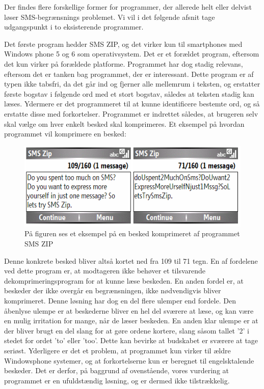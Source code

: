 Der findes flere forskellige former for programmer, der allerede helt eller delvist løser SMS-begrænsnings problemet. Vi vil i det følgende afsnit tage udgangspunkt i to eksisterende programmer.

Det første program hedder SMS ZIP, og det virker kun til smartphones med Windows phone 5 og 6 som operativsystem. Det er et forældet program, eftersom det kun virker på forældede platforme. Programmet har dog stadig relevans,  eftersom det er tanken bag programmet, der er interessant. Dette program er af typen ikke tabsfri, da det går ind og fjerner alle mellemrum i teksten, og erstatter første bogstav i følgende ord med et stort bogstav, således at teksten stadig kan læses. Ydermere er det programmeret til at kunne identificere bestemte ord, og så erstatte disse med forkortelser. Programmet er indrettet således, at brugeren selv skal vælge om hver enkelt besked skal komprimeres. Et eksempel på hvordan programmet vil komprimere en besked: \cite{download-sms} 

\begin{figure}[H]
\includegraphics []{Billeder/SMSZIP.png}
\caption {På figuren ses et eksempel på en besked komprimeret af programmet SMS ZIP}
\end{figure}

Denne konkrete besked bliver altså kortet ned fra 109 til 71 tegn. En af fordelene ved dette program er, at modtageren ikke behøver et tilsvarende dekomprimeringsprogram for at kunne læse beskeden. En anden fordel er, at beskeder der ikke overgår en begrænsningen, ikke nødvendigvis bliver komprimeret. Denne løsning har dog en del flere ulemper end fordele. Den åbenlyse ulempe er at beskederne bliver en hel del sværere at læse, og kan være en mulig irritation for mange, når de læser beskeden. En anden klar ulempe er at der bliver brugt en del slang for at gøre ordene kortere, slang såsom tallet '2' i stedet for ordet 'to' eller 'too'. Dette kan bevirke at budskabet er sværere at tage seriøst. Yderligere er det et problem, at programmet kun virker til ældre Windowsphone systemer, og at forkortelserne kun er beregnet til engelsktalende beskeder. Det er derfor, på baggrund af ovenstående, vores vurdering at programmet er en ufuldstændig løsning, og er dermed ikke tilstrækkelig.\cite{download-sms}

